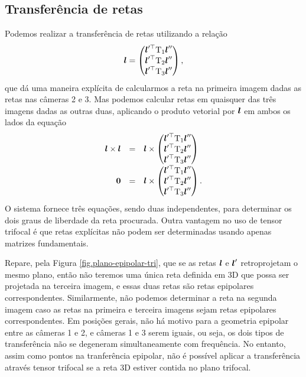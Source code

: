 \subsection{Transferência de retas}
Podemos realizar a transferência de retas utilizando a relação
\begin{equation*}
\boldsymbol{l}=
\begin{pmatrix}
\boldsymbol{l}'^\top \mbox{T}_1\boldsymbol{l}''\\
\boldsymbol{l}'^\top \mbox{T}_2\boldsymbol{l}''\\
\boldsymbol{l}'^\top \mbox{T}_3\boldsymbol{l}''
\end{pmatrix},
\end{equation*}
que dá uma maneira explícita de calcularmos a reta na primeira imagem dadas as retas nas câmeras 2 e 3. Mas podemos calcular retas em quaisquer das três imagens dadas as outras duas, aplicando o produto vetorial por $\boldsymbol{l}$ em ambos os lados da equação
\begin{equation*}
\begin{array}{rcl}
\boldsymbol{l}\times\boldsymbol{l}&=&\boldsymbol{l}\times
\begin{pmatrix}
\boldsymbol{l}'^\top \mbox{T}_1\boldsymbol{l}''\\
\boldsymbol{l}'^\top \mbox{T}_2\boldsymbol{l}''\\
\boldsymbol{l}'^\top \mbox{T}_3\boldsymbol{l}''
\end{pmatrix}\\
{\bf 0}&=&\boldsymbol{l}\times
\begin{pmatrix}
\boldsymbol{l}'^\top \mbox{T}_1\boldsymbol{l}''\\
\boldsymbol{l}'^\top \mbox{T}_2\boldsymbol{l}''\\
\boldsymbol{l}'^\top \mbox{T}_3\boldsymbol{l}''
\end{pmatrix}.\\
\end{array}
\end{equation*}
O sistema fornece três equações, sendo duas independentes, para determinar os dois graus de liberdade da reta procurada. Outra vantagem no uso de tensor trifocal é que retas explícitas não podem ser determinadas usando apenas matrizes fundamentais.

Repare, pela Figura \ref{fig.plano-epipolar-tri}, que se as retas $\boldsymbol{l}$ e $\boldsymbol{l}'$ retroprojetam o mesmo plano, então não teremos uma única reta definida em 3D que possa ser projetada na terceira imagem, e essas duas retas são retas epipolares correspondentes. Similarmente, não podemos determinar a reta na segunda imagem caso as retas na primeira e terceira imagens sejam retas epipolares correspondentes. Em posições gerais, não há motivo para a geometria epipolar entre as câmeras 1 e 2, e câmeras 1 e 3 serem iguais, ou seja, os dois tipos de transferência não se degeneram simultaneamente com frequência. No entanto, assim como pontos na tranferência epipolar, não é possível aplicar a transferência através tensor trifocal se a reta 3D estiver contida no plano trifocal. 
